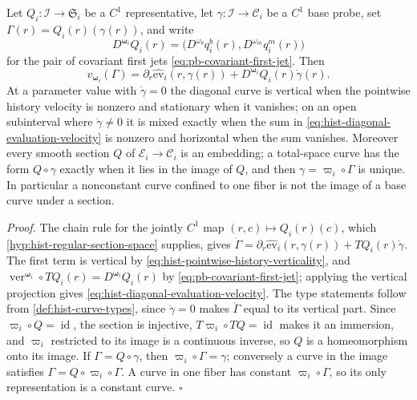 Let \(Q_i:\mathscr I\to\mathfrak S_i\) be a \(C^1\) representative, let
\(\gamma:\mathscr I\to\mathcal C_i\) be a \(C^1\) base probe, set
\(\Gamma(r)=Q_i(r)(\gamma(r))\), and write
\begin{equation}
D^{\boldsymbol\omega_i}Q_i(r)
=\bigl(D^{\omega_b}q^b_i(r),D^{\omega_m}q^m_i(r)\bigr)
\label{eq:hist-product-covariant-section-jet}
\end{equation}
for the pair of covariant first jets \eqref{eq:pb-covariant-first-jet}. Then
\begin{equation}
v_{\boldsymbol\omega_i}(\Gamma)
=\partial_r\widehat{\mathrm{ev}}_i(r,\gamma(r))
+D^{\boldsymbol\omega_i}Q_i(r)\dot\gamma(r).
\label{eq:hist-diagonal-evaluation-velocity}
\end{equation}
At a parameter value with \(\dot\gamma=0\) the diagonal curve is vertical when
the pointwise history velocity is nonzero and stationary when it vanishes; on
an open subinterval where \(\dot\gamma\ne0\) it is mixed exactly when the sum in
\eqref{eq:hist-diagonal-evaluation-velocity} is nonzero and horizontal when the
sum vanishes. Moreover every smooth section \(Q\) of
\(\mathcal E_i\to\mathcal C_i\) is an embedding; a total-space curve has the
form \(Q\circ\gamma\) exactly when it lies in the image of \(Q\), and then
\(\gamma=\varpi_i\circ\Gamma\) is unique. In particular a nonconstant curve
confined to one fiber is not the image of a base curve under a section.

\noindent\emph{Proof.}
The chain rule for the jointly \(C^1\) map \((r,c)\mapsto Q_i(r)(c)\), which
\cref{hyp:hist-regular-section-space} supplies, gives
\(\dot\Gamma=\partial_r\widehat{\mathrm{ev}}_i(r,\gamma(r))+TQ_i(r)\dot\gamma\).
The first term is vertical by \eqref{eq:hist-pointwise-history-verticality},
and \(\operatorname{ver}^{\boldsymbol\omega_i}\circ TQ_i(r)=D^{\boldsymbol\omega_i}Q_i(r)\)
by \eqref{eq:pb-covariant-first-jet}; applying the vertical projection gives
\eqref{eq:hist-diagonal-evaluation-velocity}. The type statements follow from
\cref{def:hist-curve-types}, since \(\dot\gamma=0\) makes \(\dot\Gamma\) equal to
its vertical part. Since \(\varpi_i\circ Q=\operatorname{id}\), the section is
injective, \(T\varpi_i\circ TQ=\operatorname{id}\) makes it an immersion, and
\(\varpi_i\) restricted to its image is a continuous inverse, so \(Q\) is a
homeomorphism onto its image. If \(\Gamma=Q\circ\gamma\), then
\(\varpi_i\circ\Gamma=\gamma\); conversely a curve in the image satisfies
\(\Gamma=Q\circ\varpi_i\circ\Gamma\). A curve in one fiber has constant
\(\varpi_i\circ\Gamma\), so its only representation is a constant curve.
\(\square\)

